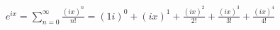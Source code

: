 \documentclass[preview]{standalone}
\begin{document}
\begin{align*}
e^{ix} = \sum_{n=0}^{\infty} \frac{(ix)^n}{n!} = (1i)^0 + (ix)^1 + \frac{(ix)^2}{2!} + \frac{(ix)^3}{3!} + \frac{(ix)^4}{4!} \\
\end{align*}
\end{document}
